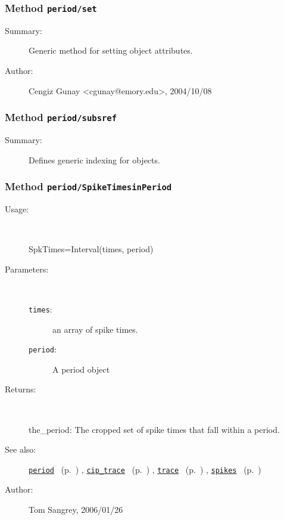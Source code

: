 \subsubsection[Method \texttt{set}]{Method \texttt{period/set}}%
%
\label{ref_period__set}%
\hypertarget{ref_period__set}{}%
\begin{description}
\item[Summary:]Generic method for setting object attributes.
%
%
%
%
%
%
%
\item[Author:]%
Cengiz Gunay <cgunay@emory.edu>, 2004/10/08%
\end{description}
\methodline%
\subsubsection[Method \texttt{subsref}]{Method \texttt{period/subsref}}%
%
\label{ref_period__subsref}%
\hypertarget{ref_period__subsref}{}%
\begin{description}
\item[Summary:]Defines generic indexing for objects.
%
%
%
%
%
%
%
%
\end{description}
\methodline%
\subsubsection[Method \texttt{SpikeTimesinPeriod}]{Method \texttt{period/SpikeTimesinPeriod}}%
%
\label{ref_period__SpikeTimesinPeriod}%
\hypertarget{ref_period__SpikeTimesinPeriod}{}%
\begin{description}
%
\item[Usage:]~%
\begin{lyxcode}%
SpkTimes=Interval(times, period)
%
\end{lyxcode}%
%
%
\item[Parameters:]~
\begin{description}%
\item[\texttt{times}:]
 an array of spike times.
\item[\texttt{period}:]
 A period object
\end{description}%
%
\item[Returns:]~

	the\_period: The cropped set of spike times that fall within a period.
%
%
\item[See also:]%
\hyperlink{ref_period}{\texttt{period}}%
\ (p.~\pageref{ref_period})%
%
, \hyperlink{ref_cip_trace}{\texttt{cip\_trace}}%
\ (p.~\pageref{ref_cip_trace})%
%
, \hyperlink{ref_trace}{\texttt{trace}}%
\ (p.~\pageref{ref_trace})%
%
, \hyperlink{ref_spikes}{\texttt{spikes}}%
\ (p.~\pageref{ref_spikes})%
%
%
\item[Author:]%
Tom Sangrey, 2006/01/26%
\end{description}
\methodline%
